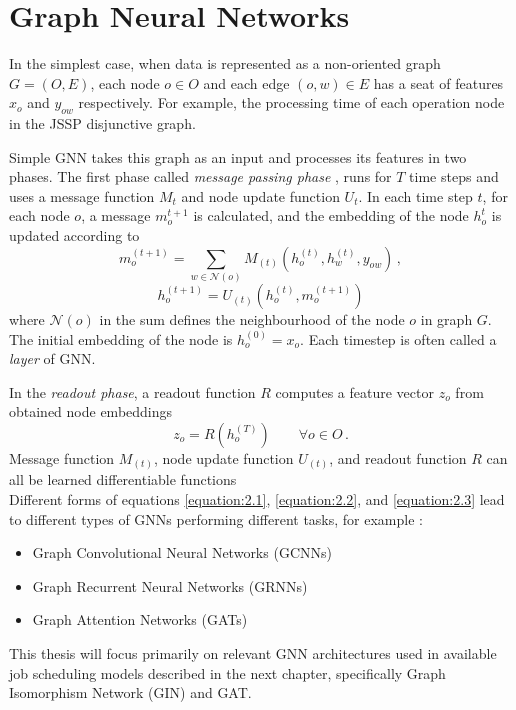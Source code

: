 \section{Graph Neural Networks}

In the simplest case, when data is represented as a non-oriented graph $G = (O, E)$, each node $o \in O$ and each edge $(o, w) \in E$ has a seat of features $x_o$ and $y_{ow}$ respectively. For example, the processing time of each operation node in the JSSP disjunctive graph. 
\par
Simple GNN takes this graph as an input and processes its features in two phases. The first phase called \textit{message passing phase} \cite{pmlr-v70-gilmer17a}, runs for $T$ time steps and uses a message function $M_t$ and node update function $U_t$. In each time step $t$, for each node $o$, a message $m_o^{t + 1}$ is calculated, and the embedding of the node $h_o^{t}$ is updated according to \cite{pmlr-v70-gilmer17a}
\begin{equation}\label{equation:2.1}
	m_o^{(t + 1)} = \sum_{w \in \mathcal{N}(o)} M_{(t)} (h_o^{(t)}, h_w^{(t)}, y_{ow}) \, ,
\end{equation}
\begin{equation}\label{equation:2.2}
	h_o^{(t+1)} = U_{(t)} (h_o^{(t)}, m_o^{(t+1)})
\end{equation}
where $\mathcal{N}(o)$ in the sum defines the neighbourhood of the node $o$ in graph $G$. The initial embedding of the node is $h_o^{(0)} = x_o$. Each timestep is often called a \textit{layer} of GNN.
\par
In the \textit{readout phase}, a readout function $R$ computes a feature vector $z_o$ from obtained node embeddings \cite{pmlr-v70-gilmer17a}
\begin{equation}\label{equation:2.3}
	z_o = R(h_o^{(T)}) \hspace{2em} \forall o \in O \, .
\end{equation}
Message function $M_{(t)}$, node update function $U_{(t)}$, and readout function $R$ can all be learned differentiable functions\\
Different forms of equations \ref{equation:2.1}, \ref{equation:2.2}, and \ref{equation:2.3} lead to different types of GNNs performing different tasks, for example \cite{sanchez-lengeling2021a, 10.1145/3495161}:
\begin{itemize}
	\item Graph Convolutional Neural Networks (GCNNs)
	\item Graph Recurrent Neural Networks (GRNNs)
	\item Graph Attention Networks (GATs)
\end{itemize} 
This thesis will focus primarily on relevant GNN architectures used in available job scheduling models described in the next chapter, specifically Graph Isomorphism Network (GIN) and GAT.


